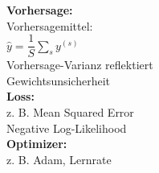 \begin{center}
\begin{minipage}[t]{0.48\textwidth}
\textbf{Vorhersage:} \\
Vorhersagemittel: \\
$\hat{y} = \dfrac{1}{S} \sum_{s} y^{(s)}$ \\
Vorhersage-Varianz reflektiert \\
Gewichtsunsicherheit \\[4pt]

\textbf{Loss:} \\
z. B. Mean Squared Error \\ 
Negative Log-Likelihood \\[4pt]

\textbf{Optimizer:} \\
z. B. Adam, Lernrate
\end{minipage}
\end{center}





%
%
%
%
%
%
%
%







